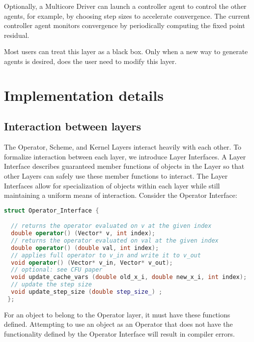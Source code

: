Optionally, a Multicore Driver can launch a controller agent to control the other agents, for example, by choosing step sizes to accelerate convergence.
The current controller agent monitors convergence by periodically computing the fixed point residual.

Most users can treat this layer as a black box. Only when a new way to generate agents is desired, does the user need to modify this layer.

\section{Implementation details}\label{sc:implement}

\subsection{Interaction between layers} \label{sc:interface}

The Operator, Scheme, and Kernel Layers interact heavily with each other. To formalize interaction between each layer, we introduce Layer Interfaces. A Layer Interface describes guaranteed member functions of objects in the Layer so that other Layers can safely use these member functions to interact. The Layer Interfaces allow for specialization of objects within each layer while still maintaining a uniform means of interaction. Consider the Operator Interface:
\begin{lstlisting}[language=C++,label={Operator_Interface}]
struct Operator_Interface {

  // returns the operator evaluated on v at the given index
  double operator() (Vector* v, int index);
  // returns the operator evaluated on val at the given index
  double operator() (double val, int index);
  // applies full operator to v_in and write it to v_out
  void operator() (Vector* v_in, Vector* v_out);
  // optional: see CFU paper
  void update_cache_vars (double old_x_i, double new_x_i, int index);
  // update the step size
  void update_step_size (double step_size_) ;
 };
\end{lstlisting}

For an object to belong to the Operator layer, it must have these functions defined.
Attempting to use an object as an Operator that does not have the functionality defined by the Operator Interface will result in compiler errors.

